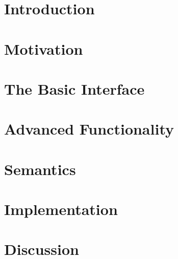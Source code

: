 \documentclass[preprint]{sigplanconf}
\newcommand{\codesec}[1]{{\fontsize{10}{12}\selectfont \tt \bfseries #1}}
\newcommand{\typesec}[1]{{\codesec{\itshape #1}}}
\newcommand{\typeparamsec}[1]{{\codesec{\bfseries #1}}}
\newcommand{\xtypesec}[2]{{\typesec{#1}\typeparamsec{[#2]}}}
\begin{document}

\terms
\xterms

\keywords
\xkeywords

\section{Introduction}
\label{sec:intro}




\section{Motivation}
\label{sec:library}


\section{The Basic Interface}
\label{sec:ref}


\section{Advanced Functionality}
\label{sec:advanced}


\section{Semantics}
\label{sec:semantics}


\section{Implementation}
\label{sec:impl}


\section{Discussion}
\label{sec:discussion}


\end{document}
